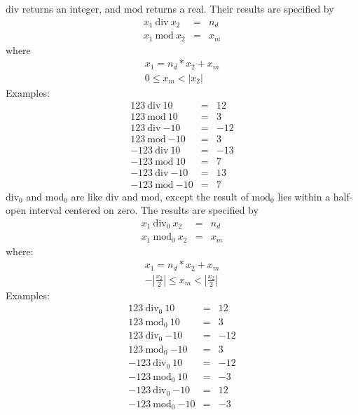 $\mathrm{div}$ returns an integer, and $\mathrm{mod}$ returns a real.
Their results are specified by
%
\begin{eqnarray*}
x_1~\mathrm{div}~x_2 &=& n_d\\
x_1~\mathrm{mod}~x_2 &=& x_m
\end{eqnarray*}
%
where
%
\begin{displaymath}
\begin{array}{c}
x_1 = n_d * x_2 + x_m\\
0 \leq x_m < |x_2|
\end{array}
\end{displaymath}
%
Examples:
\begin{eqnarray*}
123~\mathrm{div}~10    &=&  12\\
123~\mathrm{mod}~10    &=&  3\\
123~\mathrm{div}~\textrm{$-10$}   &=&  -12\\
123~\mathrm{mod}~\textrm{$-10$}   &=&  3\\
-123~\mathrm{div}~10    &=&  -13\\
-123~\mathrm{mod}~10    &=&  7\\
-123~\mathrm{div}~\textrm{$-10$}   &=&  13\\
-123~\mathrm{mod}~\textrm{$-10$}   &=&  7
\end{eqnarray*}
%
$\mathrm{div}_0$ and $\mathrm{mod}_0$ are like $\mathrm{div}$ and
$\mathrm{mod}$, except the result of $\mathrm{mod}_0$ lies within a
half-open interval centered on zero.  The results are specified by
%
\begin{eqnarray*}
x_1~\mathrm{div}_0~x_2 &=& n_d\\
x_1~\mathrm{mod}_0~x_2 &=& x_m
\end{eqnarray*}
%
where:
%
\begin{displaymath}
\begin{array}{c}
x_1 = n_d * x_2 + x_m\\
-|\frac{x_2}{2}| \leq x_m < |\frac{x_2}{2}|
\end{array}
\end{displaymath}
%
Examples:
%
\begin{eqnarray*}
123~\mathrm{div}_0~10    &=&  12\\
123~\mathrm{mod}_0~10    &=&  3\\
123~\mathrm{div}_0~\textrm{$-10$}   &=&  -12\\
123~\mathrm{mod}_0~\textrm{$-10$}   &=&  3\\
-123~\mathrm{div}_0~10    &=&  -12\\
-123~\mathrm{mod}_0~10    &=&  -3\\
-123~\mathrm{div}_0~\textrm{$-10$}   &=&  12\\
-123~\mathrm{mod}_0~\textrm{$-10$}   &=&  -3
\end{eqnarray*}

